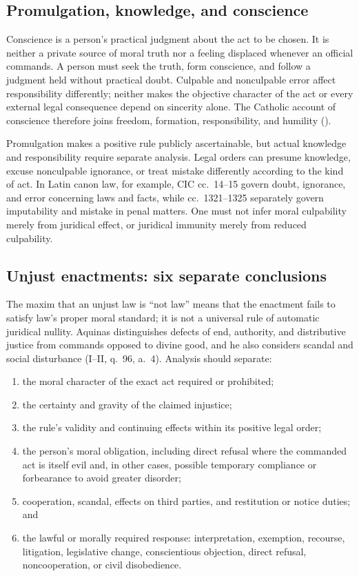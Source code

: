 \subsection{Promulgation, knowledge, and conscience}

Conscience is a person's practical judgment about the act to be chosen. It is neither a private source of moral truth nor a feeling displaced whenever an official commands. A person must seek the truth, form conscience, and follow a judgment held without practical doubt. Culpable and nonculpable error affect responsibility differently; neither makes the objective character of the act or every external legal consequence depend on sincerity alone. The Catholic account of conscience therefore joins freedom, formation, responsibility, and humility ().

Promulgation makes a positive rule publicly ascertainable, but actual knowledge and responsibility require separate analysis. Legal orders can presume knowledge, excuse nonculpable ignorance, or treat mistake differently according to the kind of act. In Latin canon law, for example, CIC cc.~14--15 govern doubt, ignorance, and error concerning laws and facts, while cc.~1321--1325 separately govern imputability and mistake in penal matters. One must not infer moral culpability merely from juridical effect, or juridical immunity merely from reduced culpability.

\subsection{Unjust enactments: six separate conclusions}

The maxim that an unjust law is ``not law'' means that the enactment fails to satisfy law's proper moral standard; it is not a universal rule of automatic juridical nullity. Aquinas distinguishes defects of end, authority, and distributive justice from commands opposed to divine good, and he also considers scandal and social disturbance (I--II, q.~96, a.~4). Analysis should separate:

\begin{enumerate}
\item the moral character of the exact act required or prohibited;
\item the certainty and gravity of the claimed injustice;
\item the rule's validity and continuing effects within its positive legal order;
\item the person's moral obligation, including direct refusal where the commanded act is itself evil and, in other cases, possible temporary compliance or forbearance to avoid greater disorder;
\item cooperation, scandal, effects on third parties, and restitution or notice duties; and
\item the lawful or morally required response: interpretation, exemption, recourse, litigation, legislative change, conscientious objection, direct refusal, noncooperation, or civil disobedience.
\end{enumerate}

